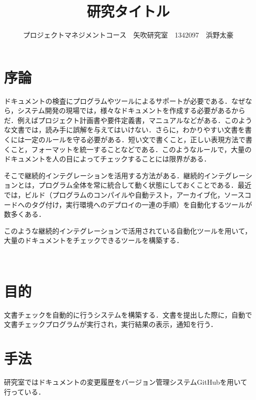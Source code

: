 \documentclass[uplatex,twocolumn,dvipdfmx]{jsarticle}
\title{\vspace{-5mm}\fontsize{14pt}{0pt}\selectfont 研究タイトル}
\author{\normalsize プロジェクトマネジメントコース　矢吹研究室　1342097　浜野太豪}
\date{}
\begin{document}
\fontsize{10.5pt}{\baselineskip}\selectfont
\maketitle





\section{序論}



\noindent

ドキュメントの検査にプログラムやツールによるサポートが必要である．なぜなら，システム開発の現場では，様々なドキュメントを作成する必要があるからだ．例えばプロジェクト計画書や要件定義書，マニュアルなどがある．このような文書では，読み手に誤解を与えてはいけない．さらに，わかりやすい文書を書くには一定のルールを守る必要がある．短い文で書くこと，正しい表現方法で書くこと，フォーマットを統一することなどである．このようなルールで，大量のドキュメントを人の目によってチェックすることには限界がある．

そこで継続的インテグレーションを活用する方法がある．継続的インテグレーションとは，プログラム全体を常に統合して動く状態にしておくことである．最近では，ビルド（プログラムのコンパイルや自動テスト，アーカイブ化，ソースコードへのタグ付け，実行環境へのデプロイの一連の手順）を自動化するツールが数多くある\cite{1}．

このような継続的インテグレーションで活用されている自動化ツールを用いて，大量のドキュメントをチェックできるツールを構築する．








　



\noindent


\section{目的}
文書チェックを自動的に行うシステムを構築する．文書を提出した際に，自動で文書チェックプログラムが実行され，実行結果の表示，通知を行う．

\section{手法}
研究室ではドキュメントの変更履歴をバージョン管理システムGitHubを用いて行っている．
\end{document}
